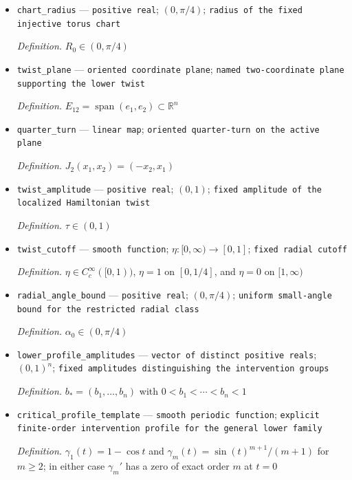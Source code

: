 \documentclass{article}
\begin{document}
\begin{itemize}
  \item \texttt{chart\_\allowbreak{}radius} --- \texttt{positive real}; \((0,\pi/4)\); \texttt{radius of the fixed injective torus chart}
  \par\smallskip\noindent\emph{Definition.} \(R_0\in(0,\pi/4)\)
  \item \texttt{twist\_\allowbreak{}plane} --- \texttt{oriented coordinate plane}; \texttt{named two-\allowbreak{}coordinate plane supporting the lower twist}
  \par\smallskip\noindent\emph{Definition.} \(E_{12}=\operatorname{span}(e_1,e_2)\subset\mathbb R^n\)
  \item \texttt{quarter\_\allowbreak{}turn} --- \texttt{linear map}; \texttt{oriented quarter-\allowbreak{}turn on the active plane}
  \par\smallskip\noindent\emph{Definition.} \(J_2(x_1,x_2)=(-x_2,x_1)\)
  \item \texttt{twist\_\allowbreak{}amplitude} --- \texttt{positive real}; \((0,1)\); \texttt{fixed amplitude of the localized Hamiltonian twist}
  \par\smallskip\noindent\emph{Definition.} \(\tau\in(0,1)\)
  \item \texttt{twist\_\allowbreak{}cutoff} --- \texttt{smooth function}; \(\eta:[0,\infty)\to[0,1]\); \texttt{fixed radial cutoff}
  \par\smallskip\noindent\emph{Definition.} \(\eta\in C_c^\infty([0,1))\), \(\eta=1\) on \([0,1/4]\), and \(\eta=0\) on \([1,\infty)\)
  \item \texttt{radial\_\allowbreak{}angle\_\allowbreak{}bound} --- \texttt{positive real}; \((0,\pi/4)\); \texttt{uniform small-\allowbreak{}angle bound for the restricted radial class}
  \par\smallskip\noindent\emph{Definition.} \(\alpha_0\in(0,\pi/4)\)
  \item \texttt{lower\_\allowbreak{}profile\_\allowbreak{}amplitudes} --- \texttt{vector of distinct positive reals}; \((0,1)^n\); \texttt{fixed amplitudes distinguishing the intervention groups}
  \par\smallskip\noindent\emph{Definition.} \(b_*=(b_1,\ldots,b_n)\) with \(0<b_1<\cdots<b_n<1\)
  \item \texttt{critical\_\allowbreak{}profile\_\allowbreak{}template} --- \texttt{smooth periodic function}; \texttt{explicit finite-\allowbreak{}order intervention profile for the general lower family}
  \par\smallskip\noindent\emph{Definition.} \(\gamma_1(t)=1-\cos t\) and \(\gamma_m(t)=\sin(t)^{m+1}/(m+1)\) for \(m\ge2\); in either case \(\gamma_m'\) has a zero of exact order \(m\) at \(t=0\)

\end{itemize}
\end{document}
